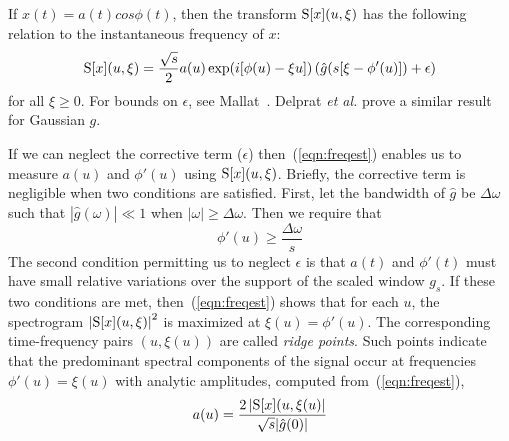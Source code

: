 If $x(t)=a(t)cos\phi(t)$, then the transform $\S[x](u,\xi)$
has the following relation to the instantaneous frequency of $x$:
\begin{equation}
\label{eqn:freqest}
\S[x](u,\xi)=\frac{\sqrt{s}}{2}a(u)\exp(i[\phi(u)-\xi u])
            \left(\hat{g}(s[\xi-\phi'(u)])+\epsilon\right)%
\end{equation}
for all $\xi \geq 0$.  For bounds on $\epsilon$,
see Mallat~\cite{Mallat:1998}.  Delprat \emph{et al.} \cite{Delprat:1992}
prove a similar result for Gaussian $g$.

If we can neglect the corrective term ($\epsilon$) %
then~(\ref{eqn:freqest}) enables us to measure $a(u)$ and $\phi'(u)$
using $\S[x](u,\xi)$.  Briefly, the corrective term is negligible when two
conditions are satisfied.
First, let the bandwidth of $\hat{g}$ be $\Delta \omega$ such that 
$|\hat{g}(\omega)|\ll 1$ when $|\omega| \geq \Delta \omega$. 
Then we require that 
\[
\phi'(u) \geq \frac{\Delta \omega}{s}
\]
The second condition permitting us to neglect $\epsilon$ %
is
that $a(t)$ and $\phi'(t)$ must have small relative variations over the
support of the scaled window $g_s$.  
If these two conditions are met, then~(\ref{eqn:freqest}) shows that
for each $u$, the spectrogram $\left|\S[x](u,\xi)\right|^2$ is maximized at
$\xi(u)=\phi'(u)$.  The corresponding time-frequency pairs
$(u,\xi(u))$ are called \emph{ridge points}.  
Such points indicate that the predominant spectral components of the
signal occur at frequencies $\phi'(u)=\xi(u)$ with analytic
amplitudes, computed from~(\ref{eqn:freqest}), 
\[
a(u) = \frac{2\left|\S[x](u,\xi(u)\right|}{\sqrt{s}|\hat{g}(0)|}
\]

